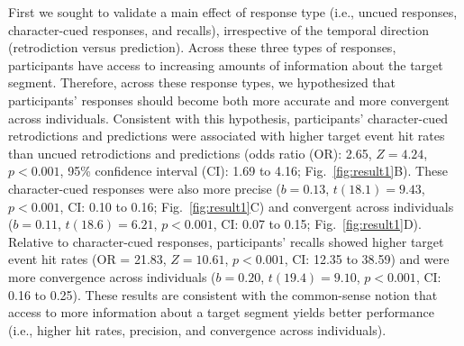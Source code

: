 \documentclass[10pt]{article}
\begin{document}
First we sought to validate a main effect of response type (i.e., uncued responses, character-cued responses, and recalls), irrespective of the temporal direction (retrodiction versus prediction).  Across these three types of responses, participants have access to increasing amounts of information about the target segment.  Therefore, across these response types, we hypothesized that participants' responses should become both more accurate and more convergent across individuals.  Consistent with this hypothesis, participants' character-cued retrodictions and predictions were associated with higher target event hit rates than uncued retrodictions and predictions (odds ratio (OR): 2.65, $Z = 4.24$, $p < 0.001$, 95\% confidence interval (CI): 1.69 to 4.16; Fig.~\ref{fig:result1}B).  These character-cued responses were also more precise ($b = 0.13$, $t(18.1) = 9.43$, $p < 0.001$, CI: 0.10 to 0.16; Fig.~\ref{fig:result1}C) and convergent across individuals ($b = 0.11$, $t(18.6) = 6.21$, $p < 0.001$, CI: 0.07 to 0.15; Fig.~\ref{fig:result1}D).   Relative to character-cued responses, participants' recalls showed higher target event hit rates (OR = 21.83, $Z = 10.61$, $p < 0.001$, CI: 12.35 to 38.59) and were more convergence across individuals ($b = 0.20$, $t(19.4) = 9.10$, $p < 0.001$, CI: 0.16 to 0.25). These results are consistent with the common-sense notion that access to more information about a target segment yields better performance (i.e., higher hit rates, precision, and convergence across individuals).
\end{document}
